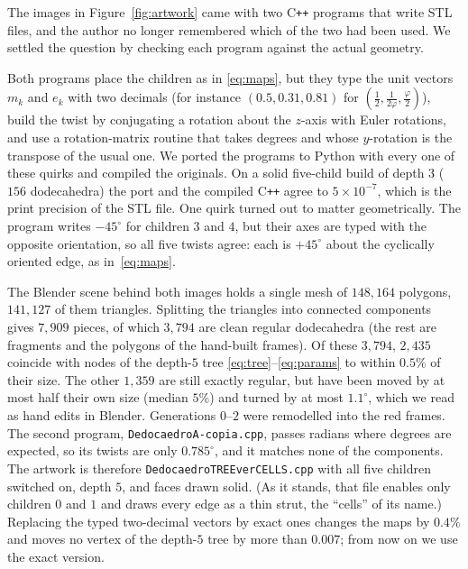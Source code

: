 \documentclass[11pt,a4paper]{article}
\theoremstyle{definition}
\theoremstyle{remark}
\begin{document}
The images in Figure~\ref{fig:artwork} came with two C\texttt{++} programs that
write STL files, and the author no longer remembered which of the two had been
used.  We settled the question by checking each program against the actual
geometry.

Both programs place the children as in \eqref{eq:maps}, but they type the unit
vectors $m_k$ and $e_k$ with two decimals (for instance $(0.5, 0.31, 0.81)$ for
$(\tfrac12,\tfrac1{2\varphi},\tfrac\varphi2)$), build the twist by conjugating a
rotation about the $z$-axis with Euler rotations, and use a rotation-matrix
routine that takes degrees and whose $y$-rotation is the transpose of the usual
one.  We ported the programs to Python with every one of these quirks and
compiled the originals.  On a solid five-child build of depth $3$ ($156$
dodecahedra) the port and the compiled C\texttt{++} agree to $5\times10^{-7}$,
which is the print precision of the STL file.  One quirk turned out to matter
geometrically.  The program writes $-45^\circ$ for children $3$ and $4$, but
their axes are typed with the opposite orientation, so all five twists agree:
each is $+45^\circ$ about the cyclically oriented edge, as in~\eqref{eq:maps}.

The Blender scene behind both images holds a single mesh of $148{,}164$
polygons, $141{,}127$ of them triangles.  Splitting the triangles into
connected components gives $7{,}909$ pieces, of which $3{,}794$ are clean
regular dodecahedra (the rest are fragments and the polygons of the hand-built
frames).  Of these $3{,}794$, $2{,}435$ coincide with nodes of the depth-$5$
tree \eqref{eq:tree}--\eqref{eq:params} to within $0.5\%$ of their size.  The
other $1{,}359$ are still exactly regular, but have been moved by at most half
their own size (median $5\%$) and turned by at most $1.1^\circ$, which we read
as hand edits in Blender.  Generations $0$--$2$ were remodelled into the red
frames.  The second program, \texttt{DedocaedroA-copia.cpp}, passes radians
where degrees are expected, so its twists are only $0.785^\circ$, and it
matches none of the components.  The artwork is therefore
\texttt{DedocaedroTREEverCELLS.cpp} with all five children switched on, depth
$5$, and faces drawn solid.  (As it stands, that file enables only children $0$
and $1$ and draws every edge as a thin strut, the ``cells'' of its name.)
Replacing the typed two-decimal vectors by exact ones changes the maps by
$0.4\%$ and moves no vertex of the depth-$5$ tree by more than $0.007$; from now
on we use the exact version.
\end{document}
